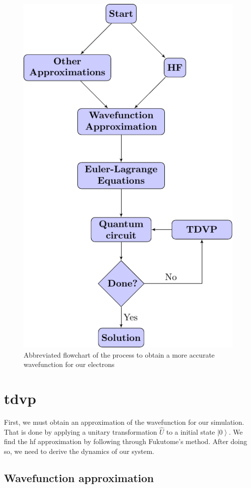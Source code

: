 \documentclass{aux/ttuthes2007}
\newcommand{\ket}[1]{\ensuremath{\left|#1\right\rangle}}
\begin{document}
\begin{figure}[hb!]
	\centering
  \includegraphics[width=.7\linewidth]{flowcharts/flowchart1.pdf}
  \caption{Abbreviated flowchart of the process to obtain a more accurate wavefunction for our electrons}
  \label{fig:flowchart1}
\end{figure}

\section{\textbf{\gls{tdvp}}}\label{sec:tdvp}
First, we must obtain an approximation of the wavefunction for our simulation. That is done by applying a unitary transformation $\hat U$ to a initial state $\ket 0$.
We find the \gls {hf} approximation by following through Fukutome's method\cite{fukutome}. After doing so, we need to derive the dynamics of our system.

\subsection{\textbf{Wavefunction approximation}}
\end{document}

